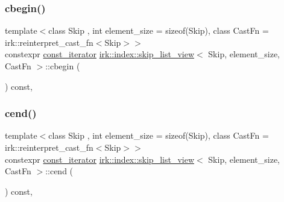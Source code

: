 \mbox{\label{classirk_1_1index_1_1skip__list__view_ae6a3b8d467288b8dd044d0ff3fab48a5}} 
\subsubsection{\texorpdfstring{cbegin()}{cbegin()}}
{\footnotesize\ttfamily template$<$class Skip , int element\+\_\+size = sizeof(\+Skip), class Cast\+Fn  = irk\+::reinterpret\+\_\+cast\+\_\+fn$<$\+Skip$>$$>$ \\
constexpr \mbox{\hyperlink{structirk_1_1index_1_1skip__list__view_1_1const__iterator}{const\+\_\+iterator}} \mbox{\hyperlink{classirk_1_1index_1_1skip__list__view}{irk\+::index\+::skip\+\_\+list\+\_\+view}}$<$ Skip, element\+\_\+size, Cast\+Fn $>$\+::cbegin (\begin{DoxyParamCaption}{ }\end{DoxyParamCaption}) const\hspace{0.3cm}{\ttfamily [inline]}, {\ttfamily [noexcept]}}

\mbox{\label{classirk_1_1index_1_1skip__list__view_afce38149f8be877dd4426e16da060dc6}} 
\subsubsection{\texorpdfstring{cend()}{cend()}}
{\footnotesize\ttfamily template$<$class Skip , int element\+\_\+size = sizeof(\+Skip), class Cast\+Fn  = irk\+::reinterpret\+\_\+cast\+\_\+fn$<$\+Skip$>$$>$ \\
constexpr \mbox{\hyperlink{structirk_1_1index_1_1skip__list__view_1_1const__iterator}{const\+\_\+iterator}} \mbox{\hyperlink{classirk_1_1index_1_1skip__list__view}{irk\+::index\+::skip\+\_\+list\+\_\+view}}$<$ Skip, element\+\_\+size, Cast\+Fn $>$\+::cend (\begin{DoxyParamCaption}{ }\end{DoxyParamCaption}) const\hspace{0.3cm}{\ttfamily [inline]}, {\ttfamily [noexcept]}}

